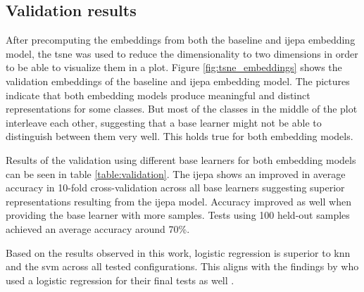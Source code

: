 \subsection{Validation results}
\label{sec:validation_results}

After precomputing the embeddings from both the baseline and \gls{ijepa} embedding model, the \gls{tsne} was used 
to reduce the dimensionality to two dimensions in order to be able to visualize them in a plot. 
Figure \ref{fig:tsne_embeddings} shows the validation embeddings of the baseline and \gls{ijepa} embedding model.
The pictures indicate that both embedding models produce meaningful and distinct representations for some classes. 
But most of the classes in the middle of the plot interleave each other, suggesting that a base learner might not be 
able to distinguish between them very well. This holds true for both embedding models.

Results of the validation using different base learners for both embedding models can be seen in table 
\ref{table:validation}. The \gls{ijepa} shows an improved in average accuracy in 10-fold cross-validation 
across all base learners suggesting superior representations resulting from the \gls{ijepa} model. 
Accuracy improved as well when providing the base learner with more samples. Tests using 100 held-out samples
achieved an average accuracy around 70\%.

Based on the results observed in this work, logistic regression is superior to \gls{knn} and the \gls{svm}
across all tested configurations. This aligns with the findings by \citeauthor{tian_rethinking_2020} who 
used a logistic regression for their final tests as well \cite{tian_rethinking_2020}.

